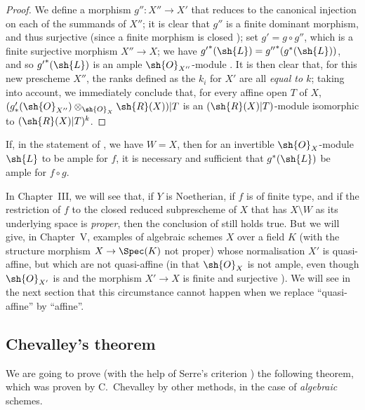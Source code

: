 \begin{proof}
We define a morphism $g'':X''\to X'$ that reduces to the canonical injection on each of the summands of $X''$;
it is clear that $g''$ is a finite dominant morphism, and thus surjective (since a finite morphism is closed );
set $g'=g\circ g''$, which is a finite surjective morphism $X''\to X$;
we have ${g'}^*(\sh{L})={g''}^*(g^*(\sh{L}))$, and so ${g'}^*(\sh{L})$ is an ample $\sh{O}_{X''}$-module .
It is then clear that, for this new prescheme $X''$, the ranks defined as the $k_i$ for $X'$ are all \emph{equal to $k$};
taking  into account, we immediately conclude that, for every affine open $T$ of $X$, $(g'_*(\sh{O}_{X''})\otimes_{\sh{O}_X}\sh{R}(X))|T$ is an $(\sh{R}(X)|T)$-module isomorphic to $(\sh{R}(X)|T)^k$.
\end{proof}

\begin{corollary}[6.6.12]
\label{II.6.6.12}
If, in the statement of , we have $W=X$, then for an invertible $\sh{O}_X$-module $\sh{L}$ to be ample for $f$, it is necessary and sufficient that $g^*(\sh{L})$ be ample for $f\circ g$.
\end{corollary}

\begin{remark}[6.6.13]
\label{II.6.6.13}
In Chapter~III, we will see that, if $Y$ is Noetherian, if $f$ is of finite type, and if the restriction of $f$ to the closed reduced subprescheme of $X$ that has $X\setminus W$ as its underlying space is \emph{proper}, then the conclusion of  still holds true.
But we will give, in Chapter~V, examples of algebraic schemes $X$ over a field $K$ (with the structure morphism $X\to\Spec(K)$ not proper) whose normalisation $X'$ is quasi-affine, but which are not quasi-affine (in that $\sh{O}_X$ is not ample, even though $\sh{O}_{X'}$ is  and the morphism $X'\to X$ is finite and surjective ).
We will see in the next section that this circumstance cannot happen when we replace ``quasi-affine'' by ``affine''.
\end{remark}


\subsection{Chevalley's theorem}
\label{subsection:II.6.7}

We are going to prove (with the help of Serre's criterion ) the following theorem, which was proven by C.~Chevalley by other methods, in the case of \emph{algebraic} schemes.

